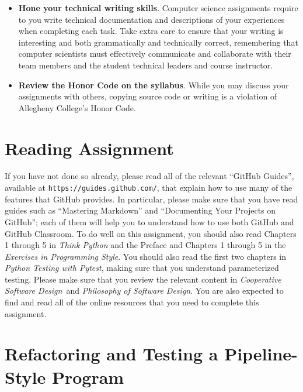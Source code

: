 \documentclass[11pt]{article}
\newcommand{\cooperative}{{\em Cooperative Software Design\/}}
\newcommand{\philosophy}{{\em Philosophy of Software Design\/}}
\newcommand{\pytest}{{\em Python Testing with Pytest\/}}
\newcommand{\url}[1]{\lstinline{#1}}
\begin{document}
\begin{itemize}
\item {\bf Hone your technical writing skills}. Computer science assignments
  require to you write technical documentation and descriptions of your
  experiences when completing each task. Take extra care to ensure that your
  writing is interesting and both grammatically and technically correct,
  remembering that computer scientists must effectively communicate and
  collaborate with their team members and the student technical leaders and
  course instructor.

\item {\bf Review the Honor Code on the syllabus}. While you may discuss your
  assignments with others, copying source code or writing is a violation of
  Allegheny College's Honor Code.

\end{itemize}

\section*{Reading Assignment}

If you have not done so already, please read all of the relevant ``GitHub
Guides'', available at \url{https://guides.github.com/}, that explain how to use
many of the features that GitHub provides. In particular, please make sure that
you have read guides such as ``Mastering Markdown'' and ``Documenting Your
Projects on GitHub''; each of them will help you to understand how to use both
GitHub and GitHub Classroom. To do well on this assignment, you should also read
Chapters 1 through 5 in {\em Think Python\/} and the Preface and Chapters 1
through 5 in the {\em Exercises in Programming Style\/}.
%
You should also read the first two chapters in \pytest, making sure that you
understand parameterized testing.
%
Please make sure that you review the relevant content in \cooperative~and
\philosophy.
%
You are also expected to find and read all of the online resources that you need
to complete this assignment.

\section*{Refactoring and Testing a Pipeline-Style Program}
\end{document}
